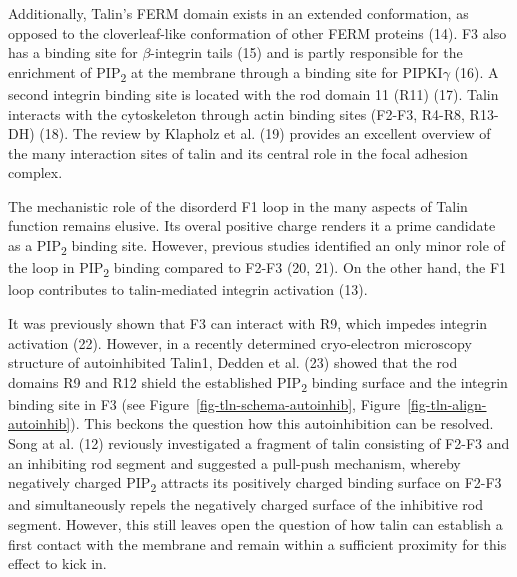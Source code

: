 \documentclass[
  letterpaper,
  DIV=11,
  numbers=noendperiod]{scrartcl}
\begin{document}
Additionally, Talin's FERM domain exists in an extended conformation, as
opposed to the cloverleaf-like conformation of other FERM proteins (14).
F3 also has a binding site for \(\beta\)-integrin tails (15) and is
partly responsible for the enrichment of PIP\textsubscript{2} at the
membrane through a binding site for PIPKI\(\gamma\) (16). A second
integrin binding site is located with the rod domain 11 (R11) (17).
Talin interacts with the cytoskeleton through actin binding sites
(F2-F3, R4-R8, R13-DH) (18). The review by Klapholz et al. (19) provides
an excellent overview of the many interaction sites of talin and its
central role in the focal adhesion complex.

The mechanistic role of the disorderd F1 loop in the many aspects of
Talin function remains elusive. Its overal positive charge renders it a
prime candidate as a PIP\textsubscript{2} binding site. However,
previous studies identified an only minor role of the loop in
PIP\textsubscript{2} binding compared to F2-F3 (20, 21). On the other
hand, the F1 loop contributes to talin-mediated integrin activation
(13).

It was previously shown that F3 can interact with R9, which impedes
integrin activation (22). However, in a recently determined
cryo-electron microscopy structure of autoinhibited Talin1, Dedden et
al. (23) showed that the rod domains R9 and R12 shield the established
PIP\textsubscript{2} binding surface and the integrin binding site in F3
(see
Figure~\ref{fig-tln-schema-autoinhib}, Figure~\ref{fig-tln-align-autoinhib}).
This beckons the question how this autoinhibition can be resolved. Song
at al. (12) reviously investigated a fragment of talin consisting of
F2-F3 and an inhibiting rod segment and suggested a pull-push mechanism,
whereby negatively charged PIP\textsubscript{2} attracts its positively
charged binding surface on F2-F3 and simultaneously repels the
negatively charged surface of the inhibitive rod segment. However, this
still leaves open the question of how talin can establish a first
contact with the membrane and remain within a sufficient proximity for
this effect to kick in.
\end{document}
